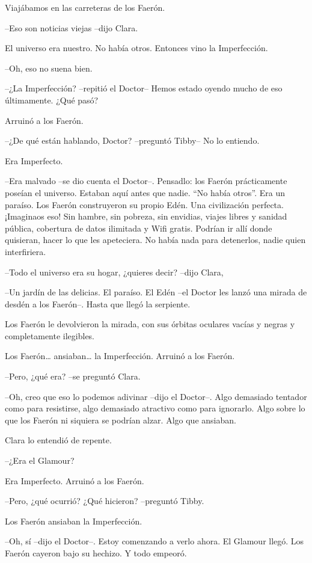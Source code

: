 {Viajábamos en las carreteras de los Faerón.}

{--Eso son noticias viejas --dijo Clara.}

{El universo era nuestro. No había otros. Entonces vino la
Imperfección.}

{--Oh, eso no suena bien.}

{--¿La Imperfección? --repitió el Doctor-- Hemos estado oyendo mucho de
eso últimamente. ¿Qué pasó?}

{Arruinó a los Faerón.}

{--¿De qué están hablando, Doctor? --preguntó Tibby-- No lo entiendo.}

{Era Imperfecto.}

{--Era malvado --se dio cuenta el Doctor--. Pensadlo: los Faerón
 prácticamente poseían el universo. Estaban aquí antes que nadie. ``No
 había otros''. Era un paraíso. Los Faerón construyeron su propio Edén.
 Una civilización perfecta. ¡Imaginaos eso! Sin hambre, sin pobreza, sin
 envidias, viajes libres y sanidad pública, cobertura de datos ilimitada
 y Wifi gratis. Podrían ir allí donde quisieran, hacer lo que les
apeteciera. No había nada para detenerlos, nadie quien interfiriera.}

{--Todo el universo era su hogar, ¿quieres decir? --dijo Clara,}

{--Un jardín de las delicias. El paraíso. El Edén --el Doctor les lanzó
una mirada de desdén a los Faerón--. Hasta que llegó la serpiente.}

{Los Faerón le devolvieron la mirada, con sus órbitas oculares vacías y
negras y completamente ilegibles.}

{Los Faerón\ldots{} ansiaban\ldots{} la Imperfección. Arruinó a los
Faerón.}

{--Pero, ¿qué era? --se preguntó Clara.}

{--Oh, creo que eso lo podemos adivinar --dijo el Doctor--. Algo
 demasiado tentador como para resistirse, algo demasiado atractivo como
 para ignorarlo. Algo sobre lo que los Faerón ni siquiera se podrían
alzar. Algo que ansiaban.}

{Clara lo entendió de repente.}

{--¿Era el Glamour?}

{Era Imperfecto. Arruinó a los Faerón.}

{--Pero, ¿qué ocurrió? ¿Qué hicieron? --preguntó Tibby.}

{Los Faerón ansiaban la Imperfección.}

{--Oh, sí --dijo el Doctor--. Estoy comenzando a verlo ahora. El Glamour
llegó. Los Faerón cayeron bajo su hechizo. Y todo empeoró.}

